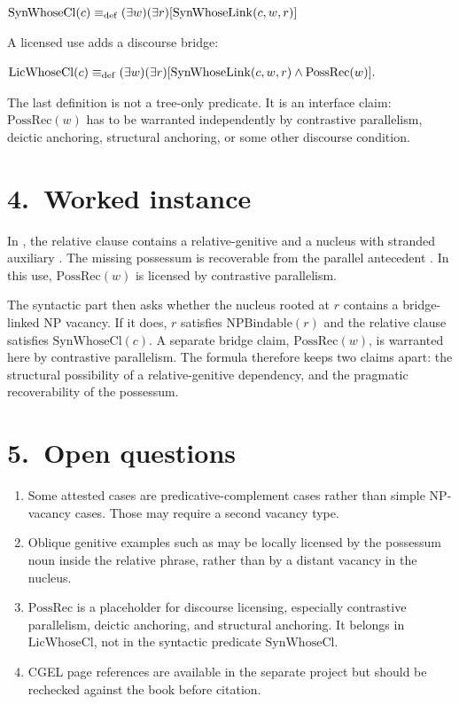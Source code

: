 \documentclass[11pt]{article}
\newcommand{\NPBindable}{\mathrm{NPBindable}}
\newcommand{\PossRec}{\mathrm{PossRec}}
\newcommand{\SynWhoseLink}{\mathrm{SynWhoseLink}}
\newcommand{\SynIndRelWhose}{\mathrm{SynWhoseCl}}
\newcommand{\LicensedIndRelWhose}{\mathrm{LicWhoseCl}}
\begin{document}
\ea
$\SynIndRelWhose(c) \defas
  (\exists w)(\exists r)[\SynWhoseLink(c,w,r)]$\\
\z

A licensed use adds a discourse bridge:

\ea
$\begin{aligned}
\LicensedIndRelWhose(c) \defas {} &
  (\exists w)(\exists r)[\SynWhoseLink(c,w,r) \wedge \PossRec(w)].
\end{aligned}$\\
\z

The last definition is not a tree-only predicate. It is an interface claim:
$\PossRec(w)$ has to be warranted independently by contrastive parallelism,
deictic anchoring, structural anchoring, or some other discourse condition.

\section*{4.~Worked instance}

In , the relative clause contains a
relative-genitive  and a nucleus with stranded auxiliary
. The missing possessum is recoverable from the parallel
antecedent . In this use,
$\PossRec(w)$ is licensed by contrastive parallelism.

The syntactic part then asks whether the nucleus rooted at $r$ contains a
bridge-linked NP vacancy. If it does, $r$ satisfies $\NPBindable(r)$ and the
relative clause satisfies $\SynIndRelWhose(c)$. A separate bridge claim,
$\PossRec(w)$, is warranted here by contrastive parallelism. The formula
therefore keeps two claims apart: the structural possibility of a
relative-genitive dependency, and the pragmatic recoverability of the
possessum.

\section*{5.~Open questions}

\begin{enumerate}[label=(\alph*),leftmargin=2em,itemsep=0.25em]
  \item Some attested cases are predicative-complement cases rather than
        simple NP-vacancy cases. Those may require a second vacancy type.
  \item Oblique genitive examples such as  may be
        locally licensed by the possessum noun inside the relative phrase,
        rather than by a distant vacancy in the nucleus.
  \item $\PossRec$ is a placeholder for discourse licensing, especially
        contrastive parallelism, deictic anchoring, and structural anchoring.
        It belongs in $\LicensedIndRelWhose$, not in the syntactic predicate
        $\SynIndRelWhose$.
  \item CGEL page references are available in the separate 
        project but should be rechecked against the book before citation.
\end{enumerate}
\end{document}
